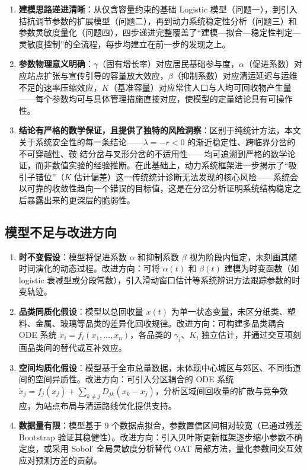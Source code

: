 \documentclass[12pt,a4paper]{ctexart}
\begin{document}
\begin{enumerate}
    \item \textbf{建模思路递进清晰}：从仅含容量约束的基础 Logistic 模型（问题一），到引入拮抗调节参数的扩展模型（问题二），再到动力系统稳定性分析（问题三）和参数灵敏度量化（问题四），四步递进完整覆盖了``建模—拟合—稳定性判定—灵敏度控制''的全流程，每步均建立在前一步的发现之上。
    \item \textbf{参数物理意义明确}：$\gamma$（固有增长率）对应居民基础参与度，$\alpha$（促进系数）对应站点扩张与宣传引导的容量放大效应，$\beta$（抑制系数）对应清运延迟与运维不足的速率压缩效应，$K$（基准容量）对应常住人口与人均可回收物产生量——每个参数均可与具体管理措施直接对应，使模型的定量结论具有可操作性。
    \item \textbf{结论有严格的数学保证，且提供了独特的风险洞察}：区别于纯统计方法，本文关于系统安全性的每一条结论——$\lambda = -r < 0$ 的渐近稳定性、跨临界分岔的不可穿越性、鞍-结分岔与叉形分岔的不适用性——均可追溯到严格的数学论证，而非数值实验的经验推断。在此基础上，动力系统框架进一步揭示了``吸引子错位''（$K$ 估计偏差）这一传统统计诊断无法发现的核心风险——系统会以可靠的收敛性趋向一个错误的目标值，这是在分岔分析证明系统结构稳定之后暴露出来的更深层的脆弱性。
\end{enumerate}

\subsection{模型不足与改进方向}

\begin{enumerate}
    \item \textbf{时不变假设}：模型将促进系数 $\alpha$ 和抑制系数 $\beta$ 视为阶段内恒定，未刻画其随时间演化的动态过程。改进方向：可将 $\alpha(t)$ 和 $\beta(t)$ 建模为时变函数（如 logistic 衰减型或分段常数），引入滑动窗口估计等系统辨识方法跟踪参数的时变轨迹。

    \item \textbf{品类同质化假设}：模型以总回收量 $x(t)$ 为单一状态变量，未区分纸类、塑料、金属、玻璃等品类的差异化回收规律。改进方向：可构建多品类耦合 ODE 系统 $\dot{x}_i = f_i(x_1, \dots, x_n)$，各品类的 $\gamma_i$、$K_i$ 独立估计，并通过交互项刻画品类间的替代或互补效应。

    \item \textbf{空间均质化假设}：模型基于全市总量数据，未体现中心城区与郊区、不同街道间的空间异质性。改进方向：可引入分区耦合的 ODE 系统 $\dot{x}_j = f_j(x_j) + \sum_{k \neq j} D_{jk}(x_k - x_j)$，分析区域间回收量的扩散与竞争效应，为站点布局与清运路线优化提供支持。

    \item \textbf{数据量有限}：模型基于 9 个数据点拟合，参数置信区间相对较宽（已通过残差 Bootstrap 验证其稳健性）。改进方向：引入贝叶斯更新框架逐步缩小参数不确定度，或采用 Sobol' 全局灵敏度分析替代 OAT 局部方法，量化参数间交互效应对预测方差的贡献。
\end{enumerate}
\end{document}

